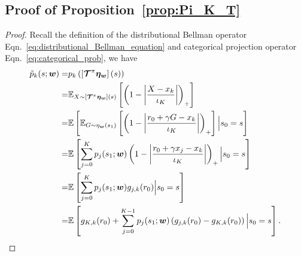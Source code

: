 \subsection{Proof of Proposition~\ref{prop:Pi_K_T}}\label{appendix:proof_Pi_K_T}
\begin{proof}
Recall the definition of the distributional Bellman operator Eqn.~\eqref{eq:distributional_Bellman_equation} and categorical projection operator Eqn.~\eqref{eq:categorical_prob}, we have
\begin{equation}\label{eq:eq_in_proof_Pi_K_T}
    \begin{aligned}
\tilde{p}_k(s;{\bm{w}})=& p_k\left({\left[{\bm{\mathcal{T}}^{\pi}\bm{\eta}_{\bm{w}}}\right](s)}\right) \\
=&{\mathbb E}_{X\sim \left[{\bm{\mathcal{T}}^{\pi}\bm{\eta}_{\bm{w}}}\right](s)}\left[{\left({1-\left|{\frac{X-x_k}{\iota_K}}\right|}\right)_+}\right]\\
=&{\mathbb E}\left[{{\mathbb E}_{G\sim \eta_{{\bm{w}}}(s_1)}\left[{\left({1-\left|{\frac{r_0+\gamma G-x_k}{\iota_K}}\right|}\right)_+}\right]\Big| s_0=s }\right]\\
=&{\mathbb E}\left[{\sum_{j=0}^Kp_j(s_1;
{\bm{w}})\left({1-\left|{\frac{r_0+\gamma x_j-x_k}{\iota_K}}\right|}\right)_+\Big| s_0=s }\right]\\
=&{\mathbb E}\left[{\sum_{j=0}^Kp_j(s_1;
{\bm{w}})g_{j,k}(r_0)\Big| s_0=s }\right]\\
=&{\mathbb E}\left[{g_{K,k}(r_0)+\sum_{j=0}^{K-1}p_j(s_1;
{\bm{w}})\left({g_{j,k}(r_0)-g_{K,k}(r_0)}\right)\Big| s_0=s }\right].
\end{aligned}
\end{equation}


\end{proof}
